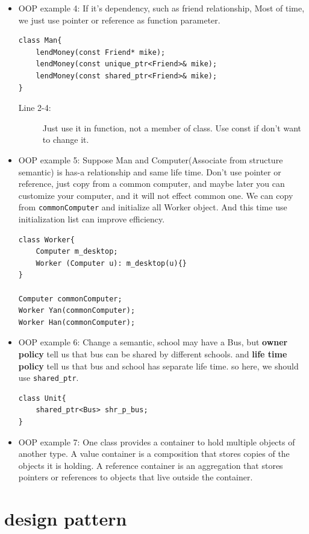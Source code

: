 \documentclass[a4paper,11pt,twoside]{book}
\begin{document}
\begin{itemize}
	
	\item OOP example 4: If it's dependency,  such as friend relationship,  Most of time, we just use pointer or reference as function parameter.
\begin{lstlisting}[numbers=none]
class Man{
	lendMoney(const Friend* mike);
    lendMoney(const unique_ptr<Friend>& mike);
    lendMoney(const shared_ptr<Friend>& mike);
}
\end{lstlisting}
\begin{description}
	\item[Line 2-4:] Just use it in function, not a member of class. Use const if don't want to change it.
\end{description}
	
	\item OOP example 5: Suppose Man and Computer(Associate from structure semantic) is has-a relationship and same life time. Don't use pointer or reference, just copy from a common computer, and maybe later you can customize your computer, and it will not effect common one.  We can copy from \texttt{commonComputer} and initialize all Worker object.  And this time use initialization list can improve efficiency.
\begin{lstlisting}[numbers=none]
class Worker{
	Computer m_desktop;
	Worker (Computer u): m_desktop(u){}
}
	
Computer commonComputer;
Worker Yan(commonComputer);
Worker Han(commonComputer);
\end{lstlisting}
	
	
	\item OOP example 6:  Change a semantic,  school may have a Bus, but \textbf{owner policy} tell us that bus can be shared by different schools. and \textbf{life time policy} tell us that bus and school has separate life time. so here, we should use \texttt{shared\_ptr}.
\begin{lstlisting}[numbers=none]
class Unit{
	shared_ptr<Bus> shr_p_bus;
}
\end{lstlisting}
	
	\item OOP example 7: One class provides a container to hold multiple objects of another type. A value container is a composition that stores copies of the objects it is holding. A reference container is an aggregation that stores pointers or references to objects that live outside the container.
	
\end{itemize}


\section{design pattern}
\end{document}
